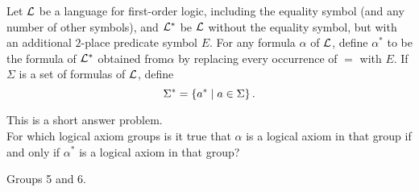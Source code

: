 \begin{problem}
  Let $\mathcal{L}$ be a language for first-order logic, including the equality symbol
  (and any number of other symbols),
  and $\mathcal{L}^*$ be $\mathcal{L}$ without the equality symbol,
  but with an additional $2$-place predicate symbol $E$.
  For any formula $\alpha$ of $\mathcal{L}$, define $\alpha^*$ to be the formula
  of $\mathcal{L}^*$ obtained from$\alpha$ by replacing every occurrence of
  $=$ with $E$. If $\Sigma$ is a set of formulas of $\mathcal{L}$,
  define \[ \Sigma^* = \left\{ a^* \mid a \in \Sigma \right\}. \]

  \begin{enumalph}
    \item This is a short answer problem.\\
      For which logical axiom groups is it true that $\alpha$ is a logical
      axiom in that group if and only if $\alpha^*$ is a logical axiom in
      that group?
      \begin{Answer}
        Groups 5 and 6.
      \end{Answer}
      

\end{enumalph}
\end{problem}
